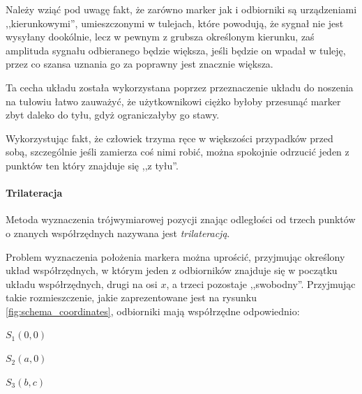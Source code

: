 Należy wziąć pod uwagę fakt, że zarówno marker jak i odbiorniki są urządzeniami ,,kierunkowymi'', umieszczonymi w tulejach, które powodują, że sygnał nie jest wysyłany dookólnie, lecz w pewnym \ppauza z grubsza określonym \ppauza kierunku, zaś amplituda sygnału odbieranego będzie większa, jeśli będzie on wpadał w tuleję, przez co szansa uznania go za poprawny jest znacznie większa.

Ta cecha układu została wykorzystana poprzez przeznaczenie układu do noszenia na tułowiu \ppauza łatwo zauważyć, że użytkownikowi ciężko byłoby przesunąć marker zbyt daleko do tyłu, gdyż ograniczałyby go stawy. 

Wykorzystując fakt, że człowiek trzyma ręce w większości przypadków przed sobą, szczególnie jeśli zamierza coś nimi robić, można spokojnie odrzucić jeden z punktów \ppauza ten który znajduje się ,,z tyłu''.

\paragraph{Trilateracja}
\label{par:trilateration}
Metoda wyznaczenia trójwymiarowej pozycji znając odległości od trzech punktów o znanych współrzędnych nazywana jest \textit{trilateracją}.

Problem wyznaczenia położenia markera można uprościć, przyjmując określony układ współrzędnych, w którym jeden z odbiorników znajduje się w początku układu współrzędnych, drugi na osi $x$, a trzeci pozostaje ,,swobodny''. Przyjmując takie rozmieszczenie, jakie zaprezentowane jest na rysunku \ref{fig:schema_coordinates}, odbiorniki mają współrzędne odpowiednio:
\begin{center}
 $S_1 (0, 0)$

 $S_2 (a, 0)$

 $S_3 (b, c)$
\end{center}

